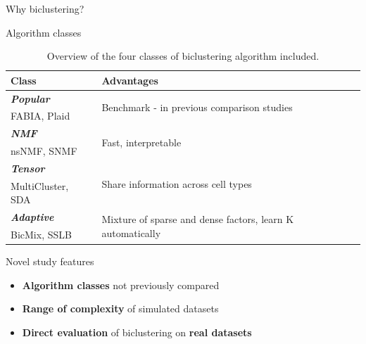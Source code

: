 \documentclass[xcolor=table,final]{beamer}
\newlength{\onecolwid}
\renewcommand{\bold}[1]{{\textcolor{norange}{\textbf{#1}}}}
\begin{document}
\begin{frame}[t]
\begin{columns}[t]
\begin{column}{\onecolwid}
\begin{block}{Why biclustering?}
\end{block}



\begin{block}{Algorithm classes}

\begin{table}[t!]
    \caption{Overview of the four classes of biclustering algorithm included.}

    \begin{tabular}{ l | l }
\textbf{Class} & \textbf{Advantages} \\ \hline
\cellcolor[HTML]{50bd4c}\color[HTML]{FFFFFF}\textbf{\textit{Popular}} & \multirow{2}{0.55 \textwidth}{Benchmark - in previous comparison studies} \\
     FABIA, Plaid & \\ \hline
    \cellcolor[HTML]{3B93DC}\color[HTML]{FFFFFF}\textbf{\textit{NMF}} & \multirow{2}{0.55 \textwidth}{Fast, interpretable} \\
    nsNMF, SNMF & \\ \hline
    \cellcolor[HTML]{7f1c8e}\color[HTML]{FFFFFF}\textbf{\textit{Tensor}} & \multirow{2}{0.55 \textwidth}{Share information across cell types} \\
    MultiCluster, SDA & \\ \hline
    \cellcolor[HTML]{C50F11}\color[HTML]{FFFFFF}\textbf{\textit{Adaptive}} & \multirow{2}{0.55 \textwidth}{Mixture of sparse and dense factors, learn K automatically} \\
    BicMix, SSLB & \\ \hline
\end{tabular}
\end{table}

\end{block}




\begin{block}{Novel study features}

\begin{itemize}
    \item \bold{Algorithm classes} not previously compared
    \item \bold{Range of complexity} of simulated datasets
    \item \bold{Direct evaluation} of biclustering on \bold{real datasets}
\end{itemize}


\end{block}
\end{column}
\end{columns}
\end{frame}
\end{document}
